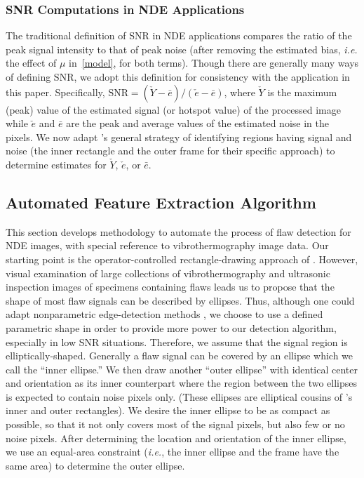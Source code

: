 \documentclass[12pt]{article}
\newcommand{\mE}{\mathcal E}
\begin{document}
\subsubsection{SNR Computations in NDE Applications}
\label{SNR}
The traditional definition of SNR in NDE applications compares the
ratio of the peak signal intensity to that 
of peak noise (after removing the estimated bias, {\em i.e.} the effect of $\mu$
in~\eqref{model}, for both terms). Though there are generally many
ways of defining SNR, we adopt this definition for consistency with
the application in this paper. Specifically, $\mbox{SNR} = (\check Y -
\bar e)/(\check e - \bar e)$, where 
$\check Y$ is the maximum (peak) value of the estimated signal (or 
hotspot value) of the processed image while $\check e$ and
$\bar e$ are the peak and average values of the estimated noise in the
pixels. We now adapt
\citet{howardandgilmore94}'s general strategy of identifying regions
having signal and noise (the inner rectangle and the outer frame for
their specific approach) to determine estimates for  $\check Y$,
$\check e$, or $\bar e$.


\subsection{Automated Feature Extraction Algorithm}
\label{algorithm}
This section develops methodology to automate the process of flaw
detection for NDE images, with special reference to vibrothermography image data. Our starting
point is the operator-controlled rectangle-drawing approach of
\citet{howardandgilmore94}. However, visual examination of large
collections of vibrothermography and ultrasonic  inspection images of
specimens containing flaws leads us to propose that the shape of most 
flaw signals can be described by ellipses. Thus, although one could adapt
nonparametric edge-detection methods \citep{osullivanandqian94,qiu05},
we choose to use a defined parametric shape in order to provide more
power to our detection algorithm, especially in low SNR
situations. Therefore, we assume that the signal region is 
elliptically-shaped. Generally a flaw signal can be covered by an
ellipse which we call the ``inner ellipse.''
We then draw another ``outer ellipse'' %
with identical center and orientation as its inner counterpart %
where the region between the two ellipses is expected to contain noise
pixels only. (These ellipses are elliptical cousins of
\citet{howardandgilmore94}'s inner and 
outer rectangles). We desire the inner ellipse to be as compact as
possible, so that it not only covers most of the signal pixels, but
also few or no noise pixels. After determining
the location and orientation of the inner ellipse, we use an
equal-area constraint ({\em i.e.}, the inner ellipse and the frame
have the same area) to determine the outer ellipse.
\end{document}
